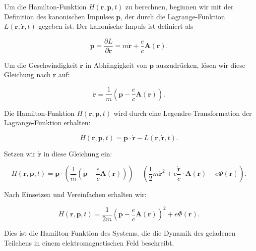 Um die Hamilton-Funktion \( H(\mathbf{r}, \mathbf{p}, t) \) zu berechnen, beginnen wir mit der Definition des kanonischen Impulses \(\mathbf{p}\), der durch die Lagrange-Funktion \( L(\mathbf{r}, \dot{\mathbf{r}}, t) \) gegeben ist. Der kanonische Impuls ist definiert als

\[
\mathbf{p} = \frac{\partial L}{\partial \dot{\mathbf{r}}} = m \dot{\mathbf{r}} + \frac{e}{c} \mathbf{A}(\mathbf{r}).
\]

Um die Geschwindigkeit \(\dot{\mathbf{r}}\) in Abhängigkeit von \(\mathbf{p}\) auszudrücken, lösen wir diese Gleichung nach \(\dot{\mathbf{r}}\) auf:

\[
\dot{\mathbf{r}} = \frac{1}{m} \left( \mathbf{p} - \frac{e}{c} \mathbf{A}(\mathbf{r}) \right).
\]

Die Hamilton-Funktion \( H(\mathbf{r}, \mathbf{p}, t) \) wird durch eine Legendre-Transformation der Lagrange-Funktion erhalten:

\[
H(\mathbf{r}, \mathbf{p}, t) = \mathbf{p} \cdot \dot{\mathbf{r}} - L(\mathbf{r}, \dot{\mathbf{r}}, t).
\]

Setzen wir \(\dot{\mathbf{r}}\) in diese Gleichung ein:

\[
H(\mathbf{r}, \mathbf{p}, t) = \mathbf{p} \cdot \left( \frac{1}{m} \left( \mathbf{p} - \frac{e}{c} \mathbf{A}(\mathbf{r}) \right) \right) - \left( \frac{1}{2} m \dot{\mathbf{r}}^2 + e \frac{\dot{\mathbf{r}}}{c} \cdot \mathbf{A}(\mathbf{r}) - e \Phi(\mathbf{r}) \right).
\]

Nach Einsetzen und Vereinfachen erhalten wir:

\[
H(\mathbf{r}, \mathbf{p}, t) = \frac{1}{2m} \left( \mathbf{p} - \frac{e}{c} \mathbf{A}(\mathbf{r}) \right)^2 + e \Phi(\mathbf{r}).
\]

Dies ist die Hamilton-Funktion des Systems, die die Dynamik des geladenen Teilchens in einem elektromagnetischen Feld beschreibt.